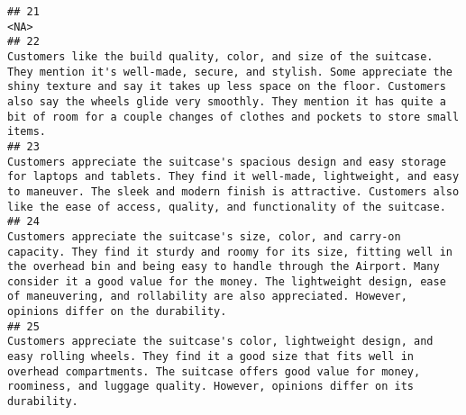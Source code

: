 \documentclass[
]{article}
\begin{document}
\begin{verbatim}
## 21                                                                                                                                                                                                                                                                                                                                                                                                                                                                                                                                                                                                                       <NA>
## 22                                                                                                                                                                                                                                                           Customers like the build quality, color, and size of the suitcase. They mention it's well-made, secure, and stylish. Some appreciate the shiny texture and say it takes up less space on the floor. Customers also say the wheels glide very smoothly. They mention it has quite a bit of room for a couple changes of clothes and pockets to store small items.
## 23                                                                                                                                                                                                                                                                                                                                    Customers appreciate the suitcase's spacious design and easy storage for laptops and tablets. They find it well-made, lightweight, and easy to maneuver. The sleek and modern finish is attractive. Customers also like the ease of access, quality, and functionality of the suitcase.
## 24                                                                                                                                                                                                                                             Customers appreciate the suitcase's size, color, and carry-on capacity. They find it sturdy and roomy for its size, fitting well in the overhead bin and being easy to handle through the Airport. Many consider it a good value for the money. The lightweight design, ease of maneuvering, and rollability are also appreciated. However, opinions differ on the durability.
## 25                                                                                                                                                                                                                                                                                                                                            Customers appreciate the suitcase's color, lightweight design, and easy rolling wheels. They find it a good size that fits well in overhead compartments. The suitcase offers good value for money, roominess, and luggage quality. However, opinions differ on its durability.

\end{verbatim}
\end{document}
